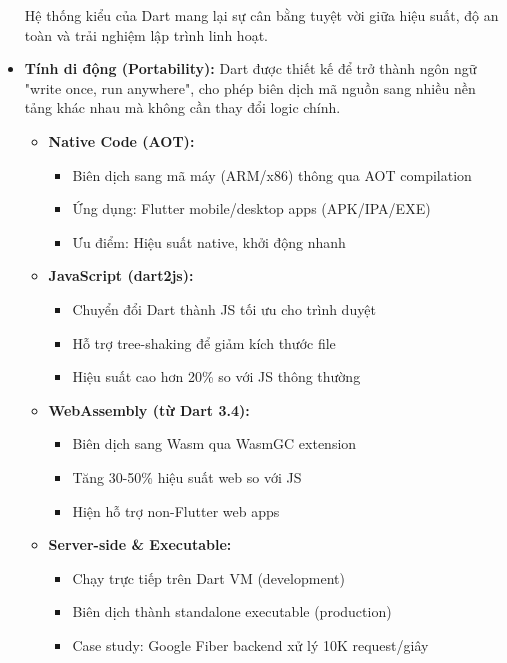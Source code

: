 \documentclass[../DoAn.tex]{subfiles}
\numberwithin{figure}{chapter}
\begin{document}
\begin{itemize}
Hệ thống kiểu của Dart mang lại sự cân bằng tuyệt vời giữa hiệu suất, độ an toàn và trải nghiệm lập trình linh hoạt.

    \item \textbf{Tính di động (Portability):} 
Dart được thiết kế để trở thành ngôn ngữ "write once, run anywhere", cho phép biên dịch mã nguồn sang nhiều nền tảng khác nhau mà không cần thay đổi logic chính.
\begin{itemize}
    \item \textbf{Native Code (AOT):} 
    \begin{itemize}
        \item Biên dịch sang mã máy (ARM/x86) thông qua AOT compilation
        \item Ứng dụng: Flutter mobile/desktop apps (APK/IPA/EXE)
        \item Ưu điểm: Hiệu suất native, khởi động nhanh
    \end{itemize}
    
    \item \textbf{JavaScript (dart2js):}
    \begin{itemize}
        \item Chuyển đổi Dart thành JS tối ưu cho trình duyệt
        \item Hỗ trợ tree-shaking để giảm kích thước file
        \item Hiệu suất cao hơn 20\% so với JS thông thường
    \end{itemize}
    
    \item \textbf{WebAssembly (từ Dart 3.4):}
    \begin{itemize}
        \item Biên dịch sang Wasm qua WasmGC extension
        \item Tăng 30-50\% hiệu suất web so với JS
        \item Hiện hỗ trợ non-Flutter web apps
    \end{itemize}
    
    \item \textbf{Server-side \& Executable:}
    \begin{itemize}
        \item Chạy trực tiếp trên Dart VM (development)
        \item Biên dịch thành standalone executable (production)
        \item Case study: Google Fiber backend xử lý 10K request/giây
    \end{itemize}
    

\end{itemize}
\end{itemize}
\end{document}
